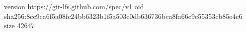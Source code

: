 version https://git-lfs.github.com/spec/v1
oid sha256:8cc9ca6f5a08fc24bb6323b1f5a503c0db636736bca8fa66c9c55353cb85e4c6
size 42647

